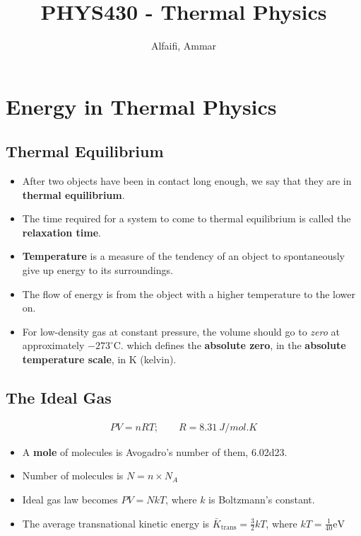 \documentclass{book}
\title{PHYS430 - Thermal Physics}
\author{Alfaifi, Ammar}
\date{}
\begin{document}
\maketitle

\chapter{Energy in Thermal Physics}


\section{Thermal Equilibrium}%
\label{sec:thermal-equilibrium}

\begin{itemize}
	\item After two objects have been in contact long enough, we say that they are in \textbf{thermal equilibrium}.
	\item The time required for a system to come to thermal equilibrium is called the \textbf{relaxation time}.
	\item \textbf{Temperature} is a measure of the tendency of an object to spontaneously give up energy to its
	      surroundings.
	\item The flow of energy is from the object with a higher temperature to the lower on.
	\item For low-density gas at constant pressure, the volume should go to \textit{zero} at
	      approximately $-273^{\circ}$C. which defines the \textbf{absolute zero}, in the
	      \textbf{absolute temperature scale}, in K (kelvin).
\end{itemize}

\section{The Ideal Gas}%
\label{sec:The Ideal Gas}
\begin{align}
	\label{eq:ideal gas law}
	PV = nRT; \qquad R = \qty{8.31}{J / mol . K}
\end{align}

\begin{itemize}
	\item A \textbf{mole} of molecules is Avogadro's number of them, \num{6.02d23}.
	\item Number of molecules is $N=n \times N_{A}$
	\item Ideal gas law becomes $PV = NkT$, where $k$ is Boltzmann's constant.
	\item The average transnational kinetic energy is $\bar{K}_{\text{trans}}= \frac{3}{2}kT$,
	      where $kT = \frac{1}{40} \si{\electronvolt}$
\end{itemize}
\end{document}
